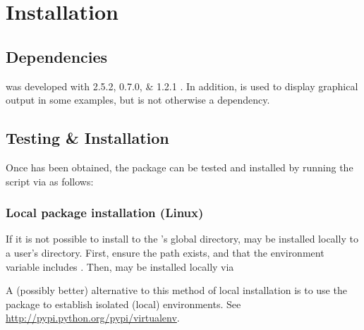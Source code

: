 \section{Installation}

\subsection{Dependencies}
\cmepy{} was developed with \python{} 2.5.2, \scipy{} 0.7.0, \& \numpy{} 1.2.1 .
In addition, \matplotlib{} is used to display graphical output in some
examples, but is not otherwise a dependency.

\subsection{Testing \& Installation}

Once \cmepy{} has been obtained, the package can be tested and installed
by running the  script via \python{} as follows:



\subsubsection{Local package installation (Linux)}
If it is not possible to install \cmepy{} to the \python{}'s global
 directory, \cmepy{} may be installed locally to a user's
 directory. First, ensure the path
 exists,
and that the 
environment variable includes
. Then, \cmepy{} may be installed locally via


A (possibly better) alternative to this method of local installation is to
use the  package to establish isolated (local)
\python{} environments. See \url{http://pypi.python.org/pypi/virtualenv}.

